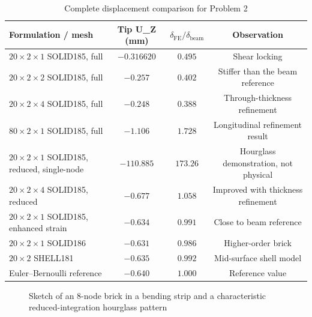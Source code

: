 \begin{table}[h!]
\centering
\begin{tabular}{|l|c|c|c|}
\toprule
\textbf{Formulation / mesh} & \textbf{Tip }U_Z\textbf{ (mm)}
& $\delta_{\mathrm{FE}}/\delta_{\mathrm{beam}}$ & \textbf{Observation}\\
\midrule
$20\times2\times1$ SOLID185, full & $-0.316620$ & $0.495$ & Shear locking\\
$20\times2\times2$ SOLID185, full & $-0.257$ & $0.402$ & Stiffer than the beam reference\\
$20\times2\times4$ SOLID185, full & $-0.248$ & $0.388$ & Through-thickness refinement\\
$80\times2\times1$ SOLID185, full & $-1.106$ & $1.728$ & Longitudinal refinement result\\
$20\times2\times1$ SOLID185, reduced, single-node & $-110.885$ & $173.26$ & Hourglass demonstration, not physical\\
$20\times2\times4$ SOLID185, reduced & $-0.677$ & $1.058$ & Improved with thickness refinement\\
$20\times2\times1$ SOLID185, enhanced strain & $-0.634$ & $0.991$ & Close to beam reference\\
$20\times2\times1$ SOLID186 & $-0.631$ & $0.986$ & Higher-order brick\\
$20\times2$ SHELL181 & $-0.635$ & $0.992$ & Mid-surface shell model\\
Euler--Bernoulli reference & $-0.640$ & $1.000$ & Reference value\\
\bottomrule
\end{tabular}
\caption{Complete displacement comparison for Problem 2}
\label{tab:solid-comparison}
\end{table}

\begin{figure}[!h]
\centering
{}
\caption{Sketch of an 8-node brick in a bending strip and a characteristic reduced-integration hourglass pattern}
\label{lab7_element_sketch}
\end{figure}

